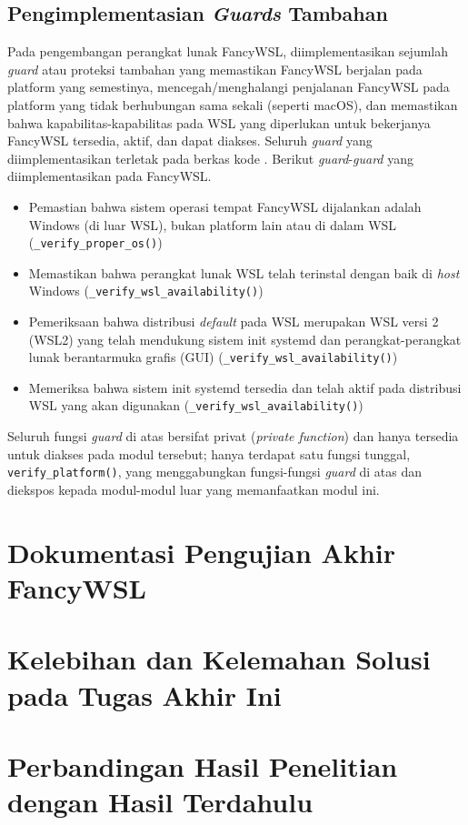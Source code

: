 \subsection{Pengimplementasian \textit{Guards} Tambahan}

Pada pengembangan perangkat lunak FancyWSL, diimplementasikan sejumlah \textit{guard} atau proteksi tambahan yang memastikan FancyWSL berjalan pada platform yang semestinya, mencegah/menghalangi penjalanan FancyWSL pada platform yang tidak berhubungan sama sekali (seperti macOS), dan memastikan bahwa kapabilitas-kapabilitas pada WSL yang diperlukan untuk bekerjanya FancyWSL tersedia, aktif, dan dapat diakses. Seluruh \textit{guard} yang diimplementasikan terletak pada berkas kode . Berikut \textit{guard}-\textit{guard} yang diimplementasikan pada FancyWSL.

\begin{itemize}
    \item Pemastian bahwa sistem operasi tempat FancyWSL dijalankan adalah Windows (di luar WSL), bukan platform lain atau di dalam WSL (\verb|_verify_proper_os()|)
    
    \item Memastikan bahwa perangkat lunak WSL telah terinstal dengan baik di \textit{host} Windows (\verb|_verify_wsl_availability()|)
    
    \item Pemeriksaan bahwa distribusi \textit{default} pada WSL merupakan WSL versi 2 (WSL2) yang telah mendukung sistem init systemd dan perangkat-perangkat lunak berantarmuka grafis (GUI) (\verb|_verify_wsl_availability()|)
    
    \item Memeriksa bahwa sistem init systemd tersedia dan telah aktif pada distribusi WSL yang akan digunakan (\verb|_verify_wsl_availability()|)
\end{itemize}

Seluruh fungsi \textit{guard} di atas bersifat privat (\textit{private function}) dan hanya tersedia untuk diakses pada modul tersebut; hanya terdapat satu fungsi tunggal, \verb|verify_platform()|, yang menggabungkan fungsi-fungsi \textit{guard} di atas dan diekspos kepada modul-modul luar yang memanfaatkan modul ini.

\section{Dokumentasi Pengujian Akhir FancyWSL}

\section{Kelebihan dan Kelemahan Solusi pada Tugas Akhir Ini}

\section{Perbandingan Hasil Penelitian dengan Hasil Terdahulu}
